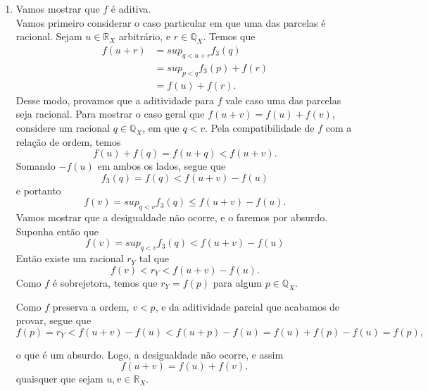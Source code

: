 \documentclass[../main.tex]{subfiles}
\begin{document}
\begin{dem}
\begin{enumerate}
\begin{enumerate}
            \item Vamos mostrar que $f$ é aditiva.\\
            Vamos primeiro considerar o caso particular em que uma das parcelas é racional.
            Sejam $u \in \mathbb{R}_X$ arbitrário, e $r \in \mathbb{Q}_X$. Temos que 
            \begin{align*}
                f(u+r) &= sup_{q < u+r}f_3(q) \\
                &= sup_{p<q}f_3(p) + f(r) \\
                &= f(u) + f(r).
            \end{align*}
            Desse modo, provamos que a aditividade para $f$ vale caso uma das parcelas seja racional.
            Para mostrar o caso geral que $f(u+v) = f(u) + f(v)$, considere um racional $q \in \mathbb{Q}_X$, em que $q < v$.
            Pela compatibilidade de $f$ com a relação de ordem, temos
                \[ f(u) + f(q) = f(u+q) < f(u+v). \]
            Somando $-f(u)$ em ambos os lados, segue que
            \[ f_3(q) = f(q) < f(u+v) - f(u)\] 
            e portanto
            \[ f(v) = sup_{q<v}f_3(q) \leq f(u+v) - f(u).\]
            Vamos mostrar que a desigualdade não ocorre, e o faremos por absurdo. Suponha então que 
            \[ f(v) = sup_{q<v}f_3(q) < f(u+v) - f(u) \]
            Então existe um racional $r_Y$ tal que 
            \[ f(v) < r_Y < f(u+v) - f(u).\]
            Como $f$ é sobrejetora, temos que $r_Y = f(p)$ para algum $p \in \mathbb{Q}_X$.

            Como $f$ preserva a ordem, $v < p$, e da aditividade parcial que acabamos de provar, segue que
            \[ f(p) = r_Y < f(u+v) - f(u) < f(u+p) - f(u) = f(u)+f(p) - f(u) = f(p), \]

            o que é um absurdo. Logo, a desigualdade não ocorre, e assim 
            \[ f(u+v) = f(u) + f(v), \] quaisquer que sejam $u,v \in \mathbb{R}_X$.


\end{enumerate}
\end{enumerate}
\end{dem}
\end{document}
